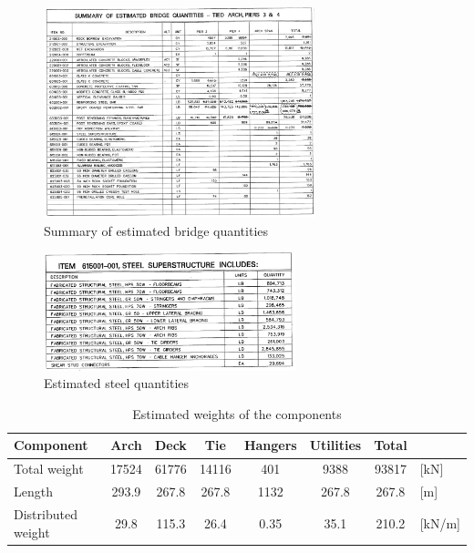 \begin{figure}[H]
    \centering
    \includegraphics[trim={0 1.4cm 0 0},clip, width=0.7\textwidth]{overleaf/Appendix/Design drawings/estimated bridge quantities.PNG}
    \caption{Summary of estimated bridge quantities}
    \label{fig:bridge_quantities}
\end{figure}
\begin{figure}[H]
    \centering
    \includegraphics[trim={0 0cm 0 0cm},clip, width=0.65\textwidth]{overleaf/Appendix/Design drawings/Steel superstructure.PNG}
    \caption{Estimated steel quantities}
    \label{fig:steel_quantities}
\end{figure}

\begin{table}[H]
\centering
\caption{Estimated weights of the components}
\label{tab:weights}
\begin{tabular}{lccccccl}
\toprule
Component          & Arch  & Deck  & Tie   & Hangers & Utilities & Total &      \\ \midrule
Total weight       & 17524 & 61776 & 14116 & 401     & 9388      & 93817 & [kN]   \\
Length             & 293.9 & 267.8 & 267.8 & 1132    & 267.8     & 267.8 & [m]    \\
Distributed weight & 29.8  & 115.3 & 26.4  & 0.35    & 35.1      & 210.2 & [kN/m] \\ \bottomrule
\end{tabular}
\end{table}

